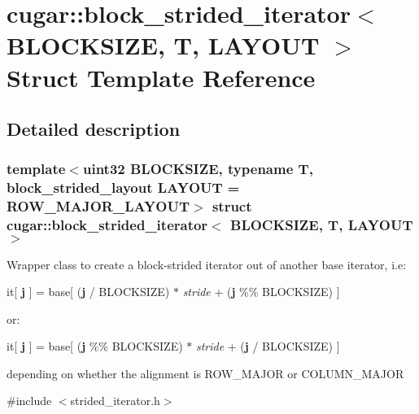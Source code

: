 \hypertarget{structcugar_1_1block__strided__iterator}{}\section{cugar\+:\+:block\+\_\+strided\+\_\+iterator$<$ B\+L\+O\+C\+K\+S\+I\+ZE, T, L\+A\+Y\+O\+UT $>$ Struct Template Reference}
\label{structcugar_1_1block__strided__iterator}


\subsection{Detailed description}
\subsubsection*{template$<$uint32 B\+L\+O\+C\+K\+S\+I\+ZE, typename T, block\+\_\+strided\+\_\+layout L\+A\+Y\+O\+UT = R\+O\+W\+\_\+\+M\+A\+J\+O\+R\+\_\+\+L\+A\+Y\+O\+UT$>$\newline
struct cugar\+::block\+\_\+strided\+\_\+iterator$<$ B\+L\+O\+C\+K\+S\+I\+Z\+E, T, L\+A\+Y\+O\+U\+T $>$}

Wrapper class to create a block-\/strided iterator out of another base iterator, i.\+e\+:

it\mbox{[} {\bfseries j} \mbox{]} = base\mbox{[} ({\bfseries j} / B\+L\+O\+C\+K\+S\+I\+ZE) $\ast$ {\itshape stride} + ({\bfseries j} \%\% B\+L\+O\+C\+K\+S\+I\+ZE) \mbox{]}

or\+:

it\mbox{[} {\bfseries j} \mbox{]} = base\mbox{[} ({\bfseries j} \%\% B\+L\+O\+C\+K\+S\+I\+ZE) $\ast$ {\itshape stride} + ({\bfseries j} / B\+L\+O\+C\+K\+S\+I\+ZE) \mbox{]}

depending on whether the alignment is R\+O\+W\+\_\+\+M\+A\+J\+OR or C\+O\+L\+U\+M\+N\+\_\+\+M\+A\+J\+OR 

{\ttfamily \#include $<$strided\+\_\+iterator.\+h$>$}

